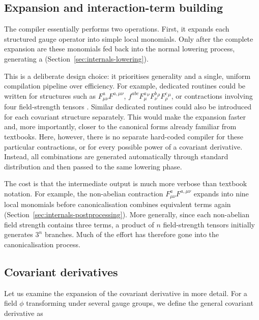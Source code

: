 \subsection{Expansion and interaction-term building}

The compiler essentially performs two operations. First, it expands each structured gauge operator into simple local monomials. Only after the complete expansion are these monomials fed back into the normal lowering process, generating a  (Section~\ref{sec:internals-lowering}).

This is a deliberate design choice: it prioritises generality and a single, uniform compilation pipeline over efficiency. For example, dedicated routines could be written for structures such as
$F^a_{\mu\nu}F^{a,\mu\nu}$,
$f^{abc}F^a_{\mu}{}^{\nu}F^b_{\nu}{}^{\rho}F^c_{\rho}{}^{\mu}$,
or contractions involving four field-strength tensors
.
Similar dedicated routines could also be introduced for each covariant structure separately. This would make the expansion faster and, more importantly, closer to the canonical forms already familiar from textbooks. Here, however, there is no separate hard-coded compiler for these particular contractions, or for every possible power of a covariant derivative. Instead, all combinations are generated automatically through standard distribution and then passed to the same lowering phase.

The cost is that the intermediate output is much more verbose than textbook notation. For example, the non-abelian contraction
$F^a_{\mu\nu}F^{a,\mu\nu}$ expands into nine local monomials before canonicalisation combines equivalent terms again (Section~\ref{sec:internals-postprocessing}). More generally, since each non-abelian field strength contains three terms, a product of $n$ field-strength tensors initially generates $3^n$ branches. Much of the effort has therefore gone into the canonicalisation process.


\subsection{Covariant derivatives}
\label{sec:internals-covd}

Let us examine the expansion of the covariant derivative in more detail. For a field $\phi$ transforming under several gauge groups, we define the general covariant derivative as

